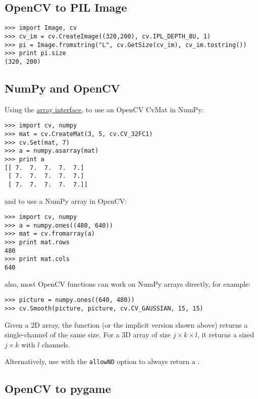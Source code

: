 \subsection{OpenCV to PIL Image}

\begin{lstlisting}
>>> import Image, cv
>>> cv_im = cv.CreateImage((320,200), cv.IPL_DEPTH_8U, 1)
>>> pi = Image.fromstring("L", cv.GetSize(cv_im), cv_im.tostring())
>>> print pi.size
(320, 200)
\end{lstlisting}

\subsection{NumPy and OpenCV}

Using the \href{http://docs.scipy.org/doc/numpy/reference/arrays.interface.html}{array interface}, to use an OpenCV CvMat in NumPy:

\begin{lstlisting}
>>> import cv, numpy
>>> mat = cv.CreateMat(3, 5, cv.CV_32FC1)
>>> cv.Set(mat, 7)
>>> a = numpy.asarray(mat)
>>> print a
[[ 7.  7.  7.  7.  7.]
 [ 7.  7.  7.  7.  7.]
 [ 7.  7.  7.  7.  7.]]
\end{lstlisting}

and to use a NumPy array in OpenCV:

\begin{lstlisting}
>>> import cv, numpy
>>> a = numpy.ones((480, 640))
>>> mat = cv.fromarray(a)
>>> print mat.rows
480
>>> print mat.cols
640
\end{lstlisting}

also, most OpenCV functions can work on NumPy arrays directly, for example:

\begin{lstlisting}
>>> picture = numpy.ones((640, 480))
>>> cv.Smooth(picture, picture, cv.CV_GAUSSIAN, 15, 15)
\end{lstlisting}

Given a 2D array, 
the  function (or the implicit version shown above)
returns a single-channel  of the same size.
For a 3D array of size $j \times k \times l$, it returns a 
 sized $j \times k$ with $l$ channels.

Alternatively, use  with the \texttt{allowND} option to always return a .

\subsection{OpenCV to pygame}


